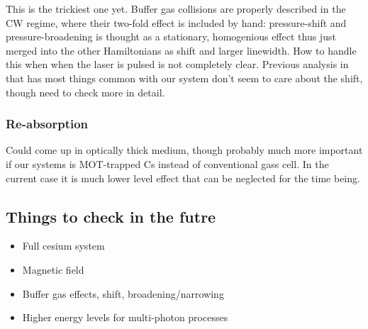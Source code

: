 \documentclass{article}
\begin{document}
\begin{spacing}{1.1}
This is the trickiest one yet. Buffer gas collisions are properly described in the CW regime, where their two-fold effect is included by hand: pressure-shift and pressure-broadening is thought as a stationary, homogenious effect thus just merged into the other Hamiltonians as shift and larger linewidth. How to handle this when when the laser is pulsed is not completely clear. Previous analysis in \cite{Riley1979} that has most things common with our system don't seem to care about the shift, though need to check more in detail.

\subsubsection{Re-absorption}

Could come up in optically thick medium, though probably much more important if our systems is MOT-trapped Cs instead of conventional gass cell. In the current case it is much lower level effect that can be neglected for the time being.




\subsection{Things to check in the futre}
\begin{itemize}
\item Full cesium system
\item Magnetic field
\item Buffer gas effects, shift, broadening/narrowing
\item Higher energy levels for multi-photon processes
\end{itemize}

\newpage
{}



\end{spacing}
\end{document}
